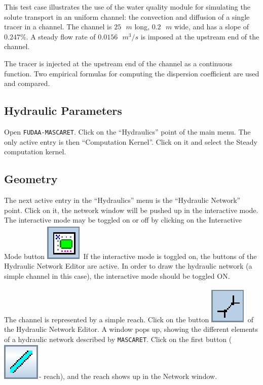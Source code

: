 \documentclass[a4paper,12pt]{article}
\begin{document}
\hspace{0.5cm}This test case illustrates the use of the water quality module for simulating the solute transport
in an uniform channel: the convection and diffusion of a single tracer in
a channel. The channel is $25\mbox{ }m$ long, $0.2\mbox{ }m$ wide, and has
a slope of $0.247\%$. A steady flow rate of $0.0156\mbox{ }m^3/s$
is imposed at the upstream end of the channel. 

\vspace{0.5cm}

The tracer is injected at the upstream end of the channel as
a continuous function. Two empirical formulas for computing
the dispersion coefficient are used and compared. 


\subsection{Hydraulic Parameters }

\hspace{0.5cm}Open \texttt{FUDAA-MASCARET}. Click on
the {}``Hydraulics'' point of the main menu. The only active entry
is then {}``Computation Kernel''. Click on it and select the Steady
computation kernel.


\subsection{Geometry}

\hspace{0.5cm}The next active entry in the {}``Hydraulics'' menu is the {}``Hydraulic
Network'' point. Click on it, the network window will be pushed up
in the interactive mode. The interactive mode may be toggled on or
off by clicking on the Interactive Mode button \includegraphics[scale=0.6]{edit_nw}
If the interactive mode is toggled on, the buttons of the Hydraulic
Network Editor are active. In order to draw the hydraulic network
(a simple channel in this case), the interactive mode should be toggled
ON. 

\vspace{0.5cm}

The channel is represented by a simple reach. Click on the button
\includegraphics[scale=0.6]{create_nw} of
the Hydraulic Network Editor. A window pops up, showing the different
elements of a hydraulic network described by \texttt{MASCARET}. Click on the
first button (\includegraphics[scale=0.6]{reach}-
reach), and the reach shows up in the Network window.
\end{document}

